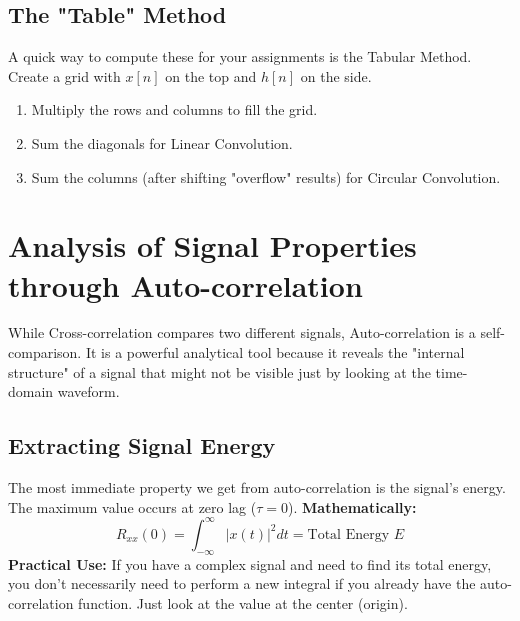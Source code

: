 \documentclass[12pt,a4paper]{article}
\begin{document}
\subsection*{The "Table" Method}
A quick way to compute these for your assignments is the Tabular Method. Create a grid with \(x[n]\) on the top and \(h[n]\) on the side.
\begin{enumerate}
    \item Multiply the rows and columns to fill the grid.
    \item Sum the diagonals for Linear Convolution.
    \item Sum the columns (after shifting "overflow" results) for Circular Convolution.
\end{enumerate}

\section*{Analysis of Signal Properties through Auto-correlation}
While Cross-correlation compares two different signals, Auto-correlation is a self-comparison. It is a powerful analytical tool because it reveals the "internal structure" of a signal that might not be visible just by looking at the time-domain waveform.

\subsection*{Extracting Signal Energy}
The most immediate property we get from auto-correlation is the signal's energy. The maximum value occurs at zero lag (\(\tau=0\)).
\textbf{Mathematically:}
\[ R_{xx}(0) = \int_{-\infty}^{\infty} |x(t)|^2 dt = \text{Total Energy } E \]
\textbf{Practical Use:} If you have a complex signal and need to find its total energy, you don't necessarily need to perform a new integral if you already have the auto-correlation function. Just look at the value at the center (origin).
\end{document}
